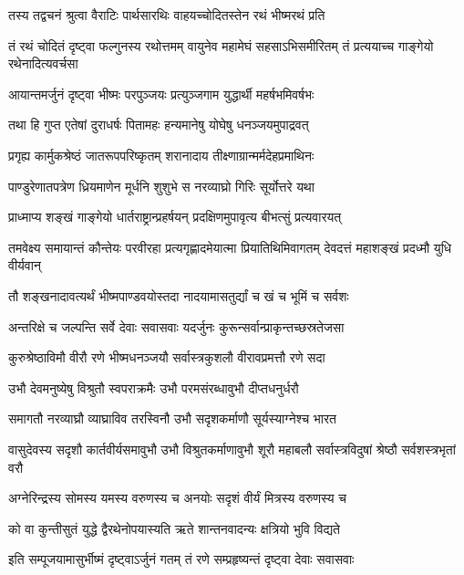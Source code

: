 
\twolineshloka
{तस्य तद्वचनं श्रुत्वा वैराटिः पार्थसारथिः}
{वाहयच्चोदितस्तेन रथं भीष्मरथं प्रति}


\threelineshloka
{तं रथं चोदितं दृष्ट्वा फल्गुनस्य रथोत्तमम्}
{वायुनेव महामेघं सहसाऽभिसमीरितम्}
{तं प्रत्ययाच्च गाङ्गेयो रथेनादित्यवर्चसा}


\twolineshloka
{आयान्तमर्जुनं दृष्ट्वा भीष्मः परपुञ्जयः}
{प्रत्युञ्जगाम युद्धार्थी महर्षभमिवर्षभः}


\twolineshloka
{तथा हि गुप्त एतेषां दुराधर्षः पितामहः}
{हन्यमानेषु योघेषु धनञ्जयमुपाद्रवत्}


\twolineshloka
{प्रगृह्य कार्मुकश्रेष्ठं जातरूपपरिष्कृतम्}
{शरानादाय तीक्ष्णाग्रान्मर्मदेहप्रमाथिनः}


\twolineshloka
{पाण्डुरेणातपत्रेण ध्रियमाणेन मूर्धनि}
{शुशुभे स नरव्याघ्रो गिरिः सूर्योत्तरे यथा}


\twolineshloka
{प्राध्माप्य शङ्खं गाङ्गेयो धार्तराष्ट्रान्प्रहर्षयन्}
{प्रदक्षिणमुपावृत्य बीभत्सुं प्रत्यवारयत्}


\threelineshloka
{तमवेक्ष्य समायान्तं कौन्तेयः परवीरहा}
{प्रत्यगृह्णादमेयात्मा प्रियातिथिमिवागतम्}
{देवदत्तं महाशङ्खं प्रदध्मौ युधि वीर्यवान्}


\twolineshloka
{तौ शङ्खनादावत्यर्थं भीष्मपाण्डवयोस्तदा}
{नादयामासतुर्द्यां च खं च भूमिं च सर्वशः}


\twolineshloka
{अन्तरिक्षे च जल्पन्ति सर्वे देवाः सवासवाः}
{यदर्जुनः कुरून्सर्वान्प्राकृन्तच्छस्रतेजसा}


\twolineshloka
{कुरुश्रेष्ठाविमौ वीरौ रणे भीष्मधनञ्जयौ}
{सर्वास्त्रकुशलौ वीरावप्रमत्तौ रणे सदा}


\twolineshloka
{उभौ देवमनुष्येषु विश्रुतौ स्वपराक्रमैः}
{उभौ परमसंरब्धावुभौ दीप्तधनुर्धरौ}


\twolineshloka
{समागतौ नरव्याघ्रौ व्याघ्राविव तरस्विनौ}
{उभौ सदृशकर्माणौ सूर्यस्याग्नेश्च भारत}


\threelineshloka
{वासुदेवस्य सदृशौ कार्तवीर्यसमावुभौ}
{उभौ विश्रुतकर्माणावुभौ शूरौ महाबलौ}
{सर्वास्त्रविदुषां श्रेष्ठौ सर्वशस्त्रभृतां वरौ}


\twolineshloka
{अग्नेरिन्द्रस्य सोमस्य यमस्य वरुणस्य च}
{अनयोः सदृशं वीर्यं मित्रस्य वरुणस्य च}


\twolineshloka
{को वा कुन्तीसुतं युद्धे द्वैरथेनोपयास्यति}
{ऋते शान्तनवादन्यः क्षत्रियो भुवि विद्यते}


\twolineshloka
{इति सम्पूजयामासुर्भीष्मं दृष्ट्वाऽर्जुनं गतम्}
{तं रणे सम्प्रहृष्यन्तं दृष्ट्वा देवाः सवासवाः}


